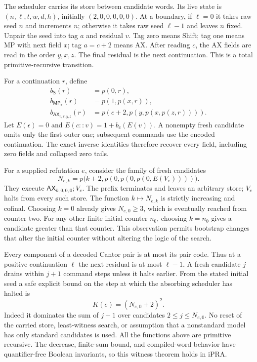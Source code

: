 \documentclass[11pt,a4paper]{article}
\newcommand{\ipra}{\mathrm{iPRA}}
\newcommand{\Ax}{\mathsf{AX}}
\newcommand{\MP}{\mathsf{MP}}
\newcommand{\Shift}{\mathsf{S}}
\begin{document}
The scheduler carries its store between candidate words. Its live state
is $(n,\ell,t,w,d,h)$, initially $(2,0,0,0,0,0)$. At a boundary, if
$\ell=0$ it takes raw seed $n$ and increments $n$; otherwise it takes
raw seed $\ell-1$ and leaves $n$ fixed. Unpair the seed into tag $a$
and residual $v$. Tag zero means Shift; tag one means MP with next
field $x$; tag $a=c+2$ means AX. After reading $c$, the AX fields are
read in the order $y,x,z$. The final residual is the next continuation.
This is a total primitive-recursive transition.

For a continuation $r$, define
\[
 \begin{split}
 b_{\Shift}(r)&=p(0,r),\\
 b_{\MP_x}(r)&=p(1,p(x,r)),\\
 b_{\Ax_{c,x,y,z}}(r)&=p(c+2,p(y,p(x,p(z,r)))).
 \end{split}
\]
Let $E(\epsilon)=0$ and $E(c::v)=1+b_c(E(v))$.
A nonempty fresh candidate omits only the first outer one; subsequent
commands use the encoded continuation. The exact inverse identities
therefore recover every field, including zero fields and collapsed
zero tails.

For a supplied refutation $e$, consider the family of fresh candidates
\[
 N_{e,k}=p\bigl(k+2,p(0,p(0,p(0,E(V_e))))\bigr).
\]
They execute $\Ax_{k,0,0,0};V_e$. The prefix terminates and leaves
an arbitrary store; $V_e$ halts from every such store. The function
$k\mapsto N_{e,k}$ is strictly increasing and cofinal. Choosing $k=0$
already gives $N_{e,0}\ge3$, which is eventually reached from counter
two. For any other finite initial counter $n_0$, choosing $k=n_0$
gives a candidate greater than that counter. This observation permits
bootstrap changes that alter the initial counter without altering
the logic of the search.

Every component of a decoded Cantor pair is at most its pair code.
Thus at a positive continuation $\ell$ the next residual is at most
$\ell-1$. A fresh candidate $j$ drains within $j+1$ command steps
unless it halts earlier. From the stated initial seed a safe explicit
bound on the step at which the absorbing scheduler has halted is
\[
 K(e)=(N_{e,0}+2)^2.
\]
Indeed it dominates the sum of $j+1$ over candidates $2\le j\le
N_{e,0}$. No reset of the carried store, least-witness search, or
assumption that a nonstandard model has only standard candidates is
used. All the functions above are primitive recursive. The
decrease, finite-sum bound, and compiled-word behavior have
quantifier-free Boolean invariants, so this witness theorem holds in
$\ipra$.
\end{document}
